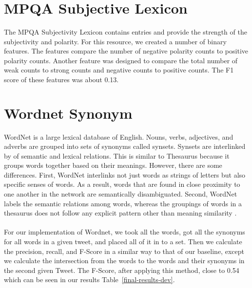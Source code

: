 \documentclass[11pt,letterpaper]{article}
\begin{document}
\section{MPQA Subjective Lexicon}
\paragraph{}
The MPQA Subjectivity Lexicon contains entries and provide the strength of the subjectivity and polarity. For this resource, we created a number of binary features. The features compare the number of negative polarity counts to positive polarity counts. Another feature was designed to compare the total number of weak counts to strong counts and negative counts to positive counts. The F1 score of these features was about 0.13. 

\section{Wordnet Synonym}
\paragraph{}
WordNet is a large lexical database of English. Nouns, verbs, adjectives, and adverbs are grouped into sets of synonyms called synsets. Synsets are interlinked by of semantic and lexical relations. This is similar to Thesaurus because it groups words together based on their meanings. However, there are some differences. First, WordNet interlinks not just words as strings of letters but also specific senses of words. As a result, words that are found in close proximity to one another in the network are semantically disambiguated. Second, WordNet labels the semantic relations among words, whereas the groupings of words in a thesaurus does not follow any explicit pattern other than meaning similarity \cite{wordnet}.
\paragraph{}
For our implementation of Wordnet, we took all the words, got all the synonyms for all words in a given tweet, and placed all of it in to a set. Then we calculate the precision, recall, and F-Score in a similar way to that of our baseline, except we calculate the intersection from the words to the words and their synonyms in the second given Tweet. The F-Score, after applying this method, close to 0.54 which can be seen in our results Table~\ref{final-results-dev}.
\end{document}
